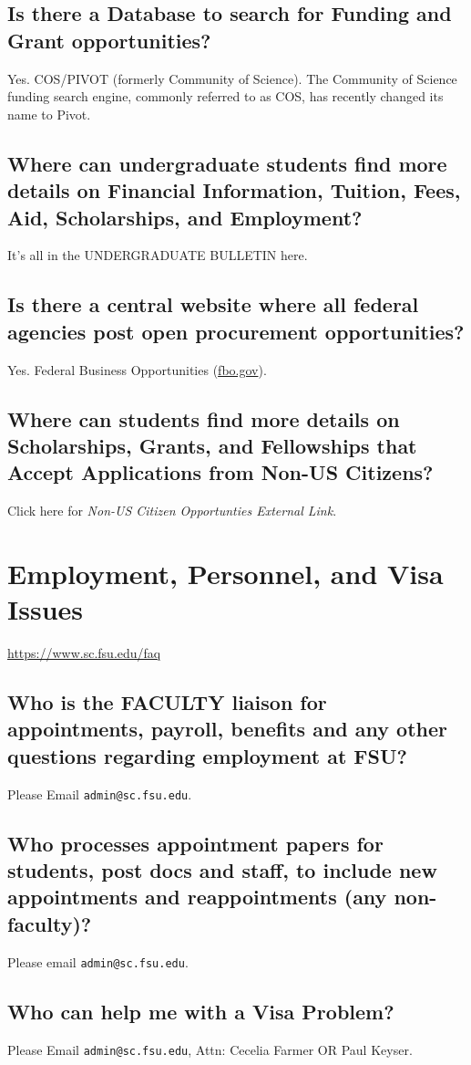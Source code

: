 \documentclass[12pt,a4paper]{article}
\begin{document}
\subsection{Is there a Database to search for Funding and Grant opportunities?}
Yes. COS/PIVOT (formerly Community of Science). The Community of Science funding search engine, commonly referred to as COS, has recently changed its name to Pivot.

\subsection{Where can undergraduate students find more details on Financial Information, Tuition, Fees, Aid, Scholarships, and Employment?}
It's all in the UNDERGRADUATE BULLETIN here.

\subsection{Is there a central website where all federal agencies post open procurement opportunities?}
Yes. Federal Business Opportunities (\url{fbo.gov}).

\subsection{Where can students find more details on Scholarships, Grants, and Fellowships that Accept Applications from Non-US Citizens?}
Click here for \textit{Non-US Citizen Opportunties External Link}.

\section{Employment, Personnel, and Visa Issues}
\url{https://www.sc.fsu.edu/faq}
\subsection{Who is the FACULTY liaison for appointments, payroll, benefits and any other questions regarding employment at FSU?}
Please Email \texttt{admin@sc.fsu.edu}.

\subsection{Who processes appointment papers for students, post docs and staff, to include new appointments and reappointments (any non-faculty)?}
Please email \texttt{admin@sc.fsu.edu}.

\subsection{Who can help me with a Visa Problem?}
Please Email \texttt{admin@sc.fsu.edu}, Attn: Cecelia Farmer OR Paul Keyser.
\end{document}
